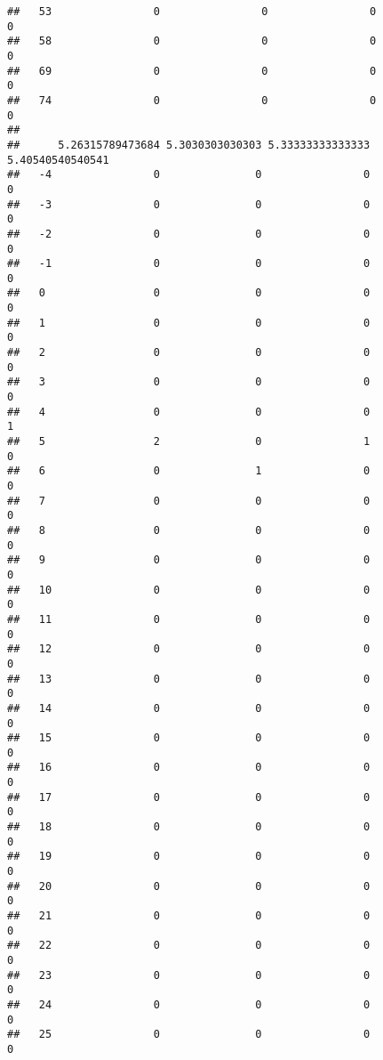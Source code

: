 \documentclass[]{article}
\begin{document}
\begin{verbatim}
##   53                0                0                0                0
##   58                0                0                0                0
##   69                0                0                0                0
##   74                0                0                0                0
##     
##      5.26315789473684 5.3030303030303 5.33333333333333 5.40540540540541
##   -4                0               0                0                0
##   -3                0               0                0                0
##   -2                0               0                0                0
##   -1                0               0                0                0
##   0                 0               0                0                0
##   1                 0               0                0                0
##   2                 0               0                0                0
##   3                 0               0                0                0
##   4                 0               0                0                1
##   5                 2               0                1                0
##   6                 0               1                0                0
##   7                 0               0                0                0
##   8                 0               0                0                0
##   9                 0               0                0                0
##   10                0               0                0                0
##   11                0               0                0                0
##   12                0               0                0                0
##   13                0               0                0                0
##   14                0               0                0                0
##   15                0               0                0                0
##   16                0               0                0                0
##   17                0               0                0                0
##   18                0               0                0                0
##   19                0               0                0                0
##   20                0               0                0                0
##   21                0               0                0                0
##   22                0               0                0                0
##   23                0               0                0                0
##   24                0               0                0                0
##   25                0               0                0                0

\end{verbatim}
\end{document}
